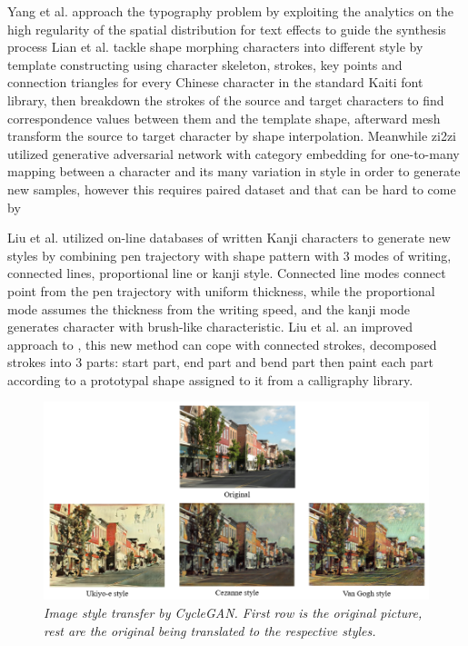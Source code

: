 \documentclass[12pt]{report}
\begin{document}
Yang et al.\cite{awesome-typography} approach the typography problem by exploiting the analytics on the
high regularity of the spatial distribution for text effects to guide the synthesis
process
Lian et al.\cite{automatic-morphing} tackle shape morphing characters into different style by template
constructing using character skeleton, strokes, key points and connection triangles
for every Chinese character in the standard Kaiti font library, then breakdown the
strokes of the source and target characters to find correspondence values between
them and the template shape, afterward mesh transform the source to target character
by shape interpolation.
Meanwhile zi2zi \cite{zi2zi} utilized generative adversarial network with category
embedding for one-to-many mapping between a character and its many variation in
style in order to generate new samples, however this requires paired dataset and that
can be hard to come by

Liu et al.\cite{online-kanji} utilized on-line databases of written Kanji characters to generate new styles by combining pen trajectory with shape pattern with 3 modes of writing, connected lines, proportional line or kanji style. Connected line modes connect point from the pen trajectory with uniform thickness, while the proportional mode assumes the thickness from the writing speed, and the kanji mode generates character with brush-like characteristic.
Liu et al.\cite{online-kanji-2} an improved approach to \cite{online-kanji}, this new method can cope with connected strokes, decomposed strokes into 3 parts: start part, end part and bend part then paint each part according to a prototypal shape assigned to it from a calligraphy library.

\begin{figure}[h]
	\centering
	\includegraphics[scale=0.65]{style-transfer}
	\caption{\textit{Image style transfer by CycleGAN. First row is the original picture, rest are the original being translated to the respective styles.}}
	\label{fig:style-transfer}
\end{figure}
\end{document}
